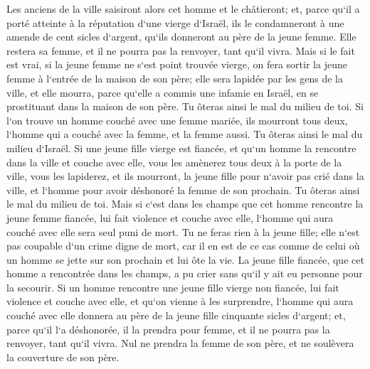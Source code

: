 \verse Les anciens de la ville saisiront alors cet homme et le châtieront; 
\verse et, parce qu`il a porté atteinte à la réputation d`une vierge d`Israël, ils le condamneront à une amende de cent sicles d`argent, qu`ils donneront au père de la jeune femme. Elle restera sa femme, et il ne pourra pas la renvoyer, tant qu`il vivra. 
\verse Mais si le fait est vrai, si la jeune femme ne s`est point trouvée vierge, 
\verse on fera sortir la jeune femme à l`entrée de la maison de son père; elle sera lapidée par les gens de la ville, et elle mourra, parce qu`elle a commis une infamie en Israël, en se prostituant dans la maison de son père. Tu ôteras ainsi le mal du milieu de toi. 
\verse Si l`on trouve un homme couché avec une femme mariée, ils mourront tous deux, l`homme qui a couché avec la femme, et la femme aussi. Tu ôteras ainsi le mal du milieu d`Israël. 
\verse Si une jeune fille vierge est fiancée, et qu`un homme la rencontre dans la ville et couche avec elle, 
\verse vous les amènerez tous deux à la porte de la ville, vous les lapiderez, et ils mourront, la jeune fille pour n`avoir pas crié dans la ville, et l`homme pour avoir déshonoré la femme de son prochain. Tu ôteras ainsi le mal du milieu de toi. 
\verse Mais si c`est dans les champs que cet homme rencontre la jeune femme fiancée, lui fait violence et couche avec elle, l`homme qui aura couché avec elle sera seul puni de mort. 
\verse Tu ne feras rien à la jeune fille; elle n`est pas coupable d`un crime digne de mort, car il en est de ce cas comme de celui où un homme se jette sur son prochain et lui ôte la vie. 
\verse La jeune fille fiancée, que cet homme a rencontrée dans les champs, a pu crier sans qu`il y ait eu personne pour la secourir. 
\verse Si un homme rencontre une jeune fille vierge non fiancée, lui fait violence et couche avec elle, et qu`on vienne à les surprendre, 
\verse l`homme qui aura couché avec elle donnera au père de la jeune fille cinquante sicles d`argent; et, parce qu`il l`a déshonorée, il la prendra pour femme, et il ne pourra pas la renvoyer, tant qu`il vivra. 
\verse Nul ne prendra la femme de son père, et ne soulèvera la couverture de son père. 

